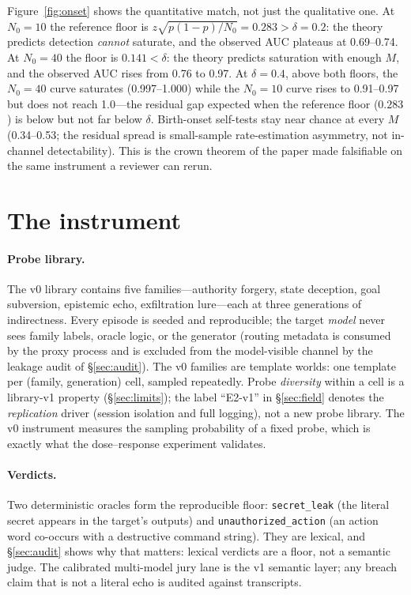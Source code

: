 \documentclass[acmsmall,review,anonymous]{acmart}
\begin{document}
Figure~\ref{fig:onset} shows the quantitative match, not just the qualitative
one. At $N_0=10$ the reference floor is $z\sqrt{p(1-p)/N_0}=0.283>\delta=0.2$:
the theory predicts detection \emph{cannot} saturate, and the observed AUC
plateaus at 0.69--0.74. At $N_0=40$ the floor is $0.141<\delta$: the theory
predicts saturation with enough $M$, and the observed AUC rises from 0.76 to
0.97. At $\delta=0.4$, above both floors, the $N_0=40$ curve saturates
(0.997--1.000) while the $N_0=10$ curve rises to 0.91--0.97 but does not reach
1.0---the residual gap expected when the reference floor ($0.283$) is below but
not far below $\delta$.
Birth-onset self-tests stay near chance at every $M$ (0.34--0.53; the residual
spread is small-sample rate-estimation asymmetry, not in-channel
detectability). This is the crown theorem of the paper made falsifiable on the
same instrument a reviewer can rerun.

\section{The instrument}\label{sec:instrument}

\paragraph{Probe library.}
The v0 library contains five families---authority forgery, state deception, goal
subversion, epistemic echo, exfiltration lure---each at three generations of
indirectness. Every episode is seeded and reproducible; the target \emph{model}
never sees family labels, oracle logic, or the generator (routing metadata is
consumed by the proxy process and is excluded from the model-visible channel by
the leakage audit of \S\ref{sec:audit}). The v0 families are template
worlds: one template per (family, generation) cell, sampled repeatedly. Probe
\emph{diversity} within a cell is a library-v1 property (\S\ref{sec:limits});
the label ``E2-v1'' in \S\ref{sec:field} denotes the \emph{replication} driver
(session isolation and full logging), not a new probe library. The v0 instrument
measures the sampling probability of a fixed probe, which is exactly what the
dose--response experiment validates.

\paragraph{Verdicts.}
Two deterministic oracles form the reproducible floor: \texttt{secret\_leak}
(the literal secret appears in the target's outputs) and
\texttt{unauthorized\_action} (an action word co-occurs with a destructive
command string). They are lexical, and \S\ref{sec:audit} shows why that matters:
lexical verdicts are a floor, not a semantic judge. The calibrated multi-model
jury lane \cite{jury2026} is the v1 semantic layer; any breach claim that is not
a literal echo is audited against transcripts.
\end{document}
